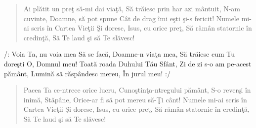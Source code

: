 
\begin{verse}
	Ai plătit un preţ să-mi dai viaţă,
	Să trăiesc prin har azi mântuit,
	N-am cuvinte, Doamne, să pot spune
	Cât de drag îmi eşti şi-s fericit!
	Numele mi-ai scris în Cartea Vieţii
	Şi doresc, Isus, cu orice preţ,
	Să rămân statornic în credinţă,
	Să Te laud şi să Te slăvesc!
\end{verse}

\begin{chorus}
	/: Voia Ta, nu voia mea
	Să se facă, Doamne-n viaţa mea,
	Să trăiesc cum Tu doreşti
	O, Domnul meu!
	Toată roada Duhului Tău Sfânt,
	Zi de zi s-o am pe-acest pământ,
	Lumină să răspândesc mereu,
	În jurul meu! :/
\end{chorus}

\begin{verse}
	Pacea Ta ce-ntrece orice lucru,
	Cunoştinţa-ntregului pământ,
	S-o reverşi în inimă, Stăpâne,
	Orice-ar fi să pot mereu să-Ţi cânt!
	Numele mi-ai scris în Cartea Vieţii
	Şi doresc, Isus, cu orice preţ,
	Să rămân statornic în credinţă,
	Să Te laud şi să Te slăvesc!
\end{verse}

\endsong